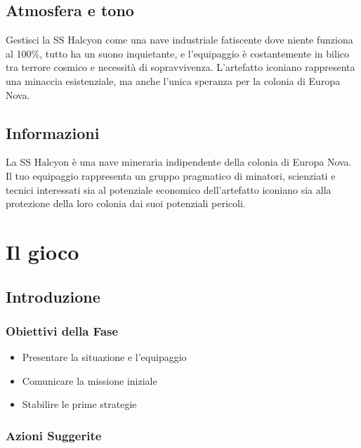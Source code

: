 \documentclass[letterpaper,twocolumn,openany,nodeprecatedcode]{dndbook}
\begin{document}
\subsection{Atmosfera e tono}
Gestisci la SS Halcyon come una nave industriale fatiscente dove niente funziona al 100\%, tutto ha un suono inquietante, e l'equipaggio è costantemente in bilico tra terrore cosmico e necessità di sopravvivenza. L'artefatto iconiano rappresenta una minaccia esistenziale, ma anche l'unica speranza per la colonia di Europa Nova.

\subsection {Informazioni}
La SS Halcyon è una nave mineraria indipendente della colonia di Europa Nova. Il tuo equipaggio rappresenta un gruppo pragmatico di minatori, scienziati e tecnici interessati sia al potenziale economico dell'artefatto iconiano sia alla protezione della loro colonia dai suoi potenziali pericoli.

\section{Il gioco}
\subsection{Introduzione}
\subsubsection{Obiettivi della Fase}

\begin{itemize}
    \item Presentare la situazione e l'equipaggio
    \item Comunicare la missione iniziale
    \item Stabilire le prime strategie
\end{itemize}

\subsubsection{Azioni Suggerite}
\end{document}

